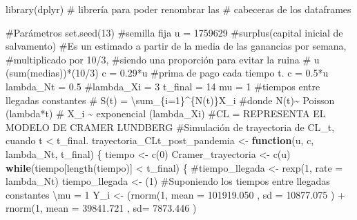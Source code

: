 \documentclass[
  us-letterpaper,
]{scrreprt}
\newenvironment{Shaded}{\begin{snugshade}}{\end{snugshade}}
\newcommand{\AttributeTok}[1]{\textcolor[rgb]{0.40,0.45,0.13}{#1}}
\newcommand{\CommentTok}[1]{\textcolor[rgb]{0.37,0.37,0.37}{#1}}
\newcommand{\ControlFlowTok}[1]{\textcolor[rgb]{0.00,0.23,0.31}{\textbf{#1}}}
\newcommand{\DecValTok}[1]{\textcolor[rgb]{0.68,0.00,0.00}{#1}}
\newcommand{\FloatTok}[1]{\textcolor[rgb]{0.68,0.00,0.00}{#1}}
\newcommand{\FunctionTok}[1]{\textcolor[rgb]{0.28,0.35,0.67}{#1}}
\newcommand{\NormalTok}[1]{\textcolor[rgb]{0.00,0.23,0.31}{#1}}
\newcommand{\OtherTok}[1]{\textcolor[rgb]{0.00,0.23,0.31}{#1}}
\newcommand{\SpecialCharTok}[1]{\textcolor[rgb]{0.37,0.37,0.37}{#1}}
\theoremstyle{plain}
\theoremstyle{plain}
\theoremstyle{definition}
\theoremstyle{remark}
\begin{document}
\begin{Shaded}
\begin{Highlighting}[]
\FunctionTok{library}\NormalTok{(dplyr) }\CommentTok{\# librería para poder renombrar las }
\CommentTok{\# cabeceras de los dataframes}

\CommentTok{\#Parámetros}
\FunctionTok{set.seed}\NormalTok{(}\DecValTok{13}\NormalTok{) }\CommentTok{\#semilla fija}
\NormalTok{u }\OtherTok{=} \DecValTok{1759629} \CommentTok{\#surplus(capital inicial de salvamento)}
\CommentTok{\#Es un estimado a partir de la media de las ganancias por semana, }
\CommentTok{\#multiplicado por 10/3, }
\CommentTok{\#siendo una proporción para evitar la ruina}
\CommentTok{\# u (sum(medias))*(10/3)}
\NormalTok{c }\OtherTok{=} \FloatTok{0.29}\SpecialCharTok{*}\NormalTok{u }\CommentTok{\#prima de pago cada tiempo t. c = 0.5*u}
\NormalTok{lambda\_Nt }\OtherTok{=} \FloatTok{0.5}
\CommentTok{\#lambda\_Xi = 3}
\NormalTok{t\_final }\OtherTok{=} \DecValTok{14}
\NormalTok{mu }\OtherTok{=} \DecValTok{1} \CommentTok{\#tiempos entre llegadas constantes}
\CommentTok{\# S(t) = \textbackslash{}sum\_\{i=1\}\^{}\{N(t)\}X\_i}
\CommentTok{\#donde N(t)\textasciitilde{} Poisson (lambda*t)}
\CommentTok{\# X\_i \textasciitilde{} exponencial (lambda\_Xi)}
\CommentTok{\#CL = REPRESENTA EL MODELO DE CRAMER LUNDBERG}
\CommentTok{\#Simulación de trayectoria de CL\_t, cuando t \textless{} t\_final.}
\NormalTok{trayectoria\_CLt\_post\_pandemia }\OtherTok{\textless{}{-}} \ControlFlowTok{function}\NormalTok{(u, c, lambda\_Nt, t\_final)}
\NormalTok{\{}
\NormalTok{  tiempo }\OtherTok{\textless{}{-}} \FunctionTok{c}\NormalTok{(}\DecValTok{0}\NormalTok{)}
\NormalTok{  Cramer\_trayectoria }\OtherTok{\textless{}{-}} \FunctionTok{c}\NormalTok{(u)}
  \ControlFlowTok{while}\NormalTok{(tiempo[}\FunctionTok{length}\NormalTok{(tiempo)] }\SpecialCharTok{\textless{}}\NormalTok{ t\_final)}
\NormalTok{  \{}
    \CommentTok{\#tiempo\_llegada \textless{}{-} rexp(1, rate = lambda\_Nt)}
\NormalTok{    tiempo\_llegada }\OtherTok{\textless{}{-}}\NormalTok{ (}\DecValTok{1}\NormalTok{) }
\CommentTok{\#Suponiendo los tiempos entre llegadas constantes \textbackslash{}mu = 1}
\NormalTok{    Y\_i }\OtherTok{\textless{}{-}}\NormalTok{  (}\FunctionTok{rnorm}\NormalTok{(}\DecValTok{1}\NormalTok{, }\AttributeTok{mean =} \FloatTok{101919.050}\NormalTok{ , }\AttributeTok{sd =} \FloatTok{10877.075}\NormalTok{   ) }
              \SpecialCharTok{+} \FunctionTok{rnorm}\NormalTok{(}\DecValTok{1}\NormalTok{, }\AttributeTok{mean =}  \FloatTok{39841.721}\NormalTok{ , }\AttributeTok{sd=} \FloatTok{7873.446}\NormalTok{  ) }

\end{Highlighting}
\end{Shaded}
\end{document}
